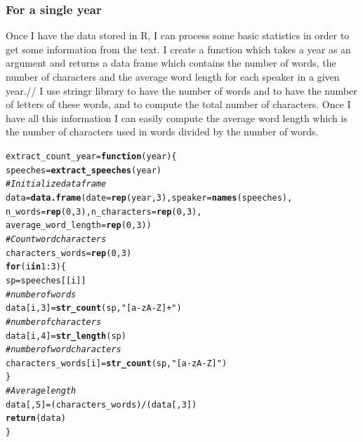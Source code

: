 \documentclass{llncs}\usepackage[]{graphicx}\usepackage[]{color}
\makeatletter
\newcommand{\hlnum}[1]{\textcolor[rgb]{0.686,0.059,0.569}{#1}}%
\newcommand{\hlstr}[1]{\textcolor[rgb]{0.192,0.494,0.8}{#1}}%
\newcommand{\hlcom}[1]{\textcolor[rgb]{0.678,0.584,0.686}{\textit{#1}}}%
\newcommand{\hlopt}[1]{\textcolor[rgb]{0,0,0}{#1}}%
\newcommand{\hlstd}[1]{\textcolor[rgb]{0.345,0.345,0.345}{#1}}%
\newcommand{\hlkwa}[1]{\textcolor[rgb]{0.161,0.373,0.58}{\textbf{#1}}}%
\newcommand{\hlkwb}[1]{\textcolor[rgb]{0.69,0.353,0.396}{#1}}%
\newcommand{\hlkwc}[1]{\textcolor[rgb]{0.333,0.667,0.333}{#1}}%
\newcommand{\hlkwd}[1]{\textcolor[rgb]{0.737,0.353,0.396}{\textbf{#1}}}%
\newenvironment{kframe}{%
 \def\at@end@of@kframe{}%
 \ifinner\ifhmode%
  \def\at@end@of@kframe{\end{minipage}}%
  \begin{minipage}{\columnwidth}%
 \fi\fi%
 \def\FrameCommand##1{\hskip\@totalleftmargin \hskip-\fboxsep
 \colorbox{shadecolor}{##1}\hskip-\fboxsep
     \hskip-\linewidth \hskip-\@totalleftmargin \hskip\columnwidth}%
 \MakeFramed {\advance\hsize-\width
   \@totalleftmargin\z@ \linewidth\hsize
   \@setminipage}}%
 {\par\unskip\endMakeFramed%
 \at@end@of@kframe}
\newenvironment{knitrout}{}{} %
\makeatother
\begin{document}
\subsubsection{For a single year}
Once I have the data stored in R, I can process some basic statistics in order to get some information from the text. I create a function which takes a year as an argument and returns a data frame which contains the number of words, the number of characters and the average word length for each speaker in a given year.//
I use stringr library to have the number of words and to have the number of letters of these words, and to compute the total number of characters. Once I have all this information I can easily compute the average word length which is the number of characters used in words divided by the number of words.
\begin{knitrout}
\color{fgcolor}\begin{kframe}
\begin{alltt}
\hlstd{extract_count_year} \hlkwb{=} \hlkwa{function}\hlstd{(}\hlkwc{year}\hlstd{)\{}
  \hlstd{speeches}\hlkwb{=} \hlkwd{extract_speeches}\hlstd{(year)}
  \hlcom{#Initialize data frame}
  \hlstd{data}\hlkwb{=}\hlkwd{data.frame}\hlstd{(}\hlkwc{date}\hlstd{=}\hlkwd{rep}\hlstd{(year,}\hlnum{3}\hlstd{),}\hlkwc{speaker}\hlstd{=}\hlkwd{names}\hlstd{(speeches),}
                  \hlkwc{n_words}\hlstd{=}\hlkwd{rep}\hlstd{(}\hlnum{0}\hlstd{,}\hlnum{3}\hlstd{),}\hlkwc{n_characters}\hlstd{=}\hlkwd{rep}\hlstd{(}\hlnum{0}\hlstd{,}\hlnum{3}\hlstd{),}
                  \hlkwc{average_word_length}\hlstd{=}\hlkwd{rep}\hlstd{(}\hlnum{0}\hlstd{,}\hlnum{3}\hlstd{))}
  \hlcom{#Count word characters}
  \hlstd{characters_words}\hlkwb{=}\hlkwd{rep}\hlstd{(}\hlnum{0}\hlstd{,}\hlnum{3}\hlstd{)}
  \hlkwa{for} \hlstd{(i} \hlkwa{in} \hlnum{1}\hlopt{:}\hlnum{3}\hlstd{)\{}
    \hlstd{sp}\hlkwb{=}\hlstd{speeches[[i]]}
    \hlcom{#number of words}
    \hlstd{data[i,}\hlnum{3}\hlstd{]}\hlkwb{=}\hlkwd{str_count}\hlstd{(sp,}\hlstr{"[a-zA-Z]+"}\hlstd{)}
    \hlcom{#number of characters}
    \hlstd{data[i,}\hlnum{4}\hlstd{]}\hlkwb{=}\hlkwd{str_length}\hlstd{(sp)}
    \hlcom{#number of word characters }
    \hlstd{characters_words[i]}\hlkwb{=}\hlkwd{str_count}\hlstd{(sp,}\hlstr{"[a-zA-Z]"}\hlstd{)}
  \hlstd{\}}
  \hlcom{#Average length}
  \hlstd{data[,}\hlnum{5}\hlstd{]}\hlkwb{=}\hlstd{(characters_words)}\hlopt{/}\hlstd{(data[,}\hlnum{3}\hlstd{])}
  \hlkwd{return} \hlstd{(data)}
\hlstd{\}}
\end{alltt}
\end{kframe}
\end{knitrout}
\end{document}
